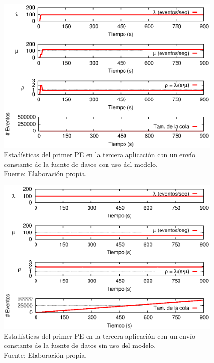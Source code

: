 \begin{figure}[!htp]
    \centering
    \captionsetup{justification=centering}
    \includegraphics[scale=1]{images/exp/app3/cm/logical/statusOnePE.eps}
    \caption[Estadísticas del primer PE en la tercera aplicación con un envío constante de la fuente de datos con uso del modelo.]{Estadísticas del primer PE en la tercera aplicación con un envío constante de la fuente de datos con uso del modelo.\\Fuente: Elaboración propia.}
    \label{fig:app3-statusOnePE-cm}
\end{figure}

\begin{figure}[!htp]
    \centering
    \captionsetup{justification=centering}
    \includegraphics[scale=1]{images/exp/app3/sm/logical/statusOnePE.eps}
    \caption[Estadísticas del primer PE en la tercera aplicación con un envío constante de la fuente de datos sin uso del modelo.]{Estadísticas del primer PE en la tercera aplicación con un envío constante de la fuente de datos sin uso del modelo.\\Fuente: Elaboración propia.}
    \label{fig:app3-statusOnePE-sm}
\end{figure}

